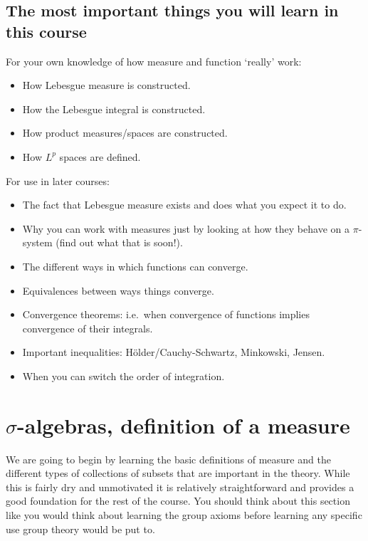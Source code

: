 \documentclass[
]{book}
\providecommand{\tightlist}{%
  \setlength{\itemsep}{0pt}\setlength{\parskip}{0pt}}
\theoremstyle{definition}
\theoremstyle{definition}
\theoremstyle{definition}
\theoremstyle{definition}
\theoremstyle{remark}
\begin{document}
\hypertarget{the-most-important-things-you-will-learn-in-this-course}{%
\section{The most important things you will learn in this course}\label{the-most-important-things-you-will-learn-in-this-course}}

For your own knowledge of how measure and function `really' work:

\begin{itemize}
\tightlist
\item
  How Lebesgue measure is constructed.
\item
  How the Lebesgue integral is constructed.
\item
  How product measures/spaces are constructed.
\item
  How \(L^p\) spaces are defined.
\end{itemize}

For use in later courses:

\begin{itemize}
\tightlist
\item
  The fact that Lebesgue measure exists and does what you expect it to do.
\item
  Why you can work with measures just by looking at how they behave on a \(\pi\)-system (find out what that is soon!).
\item
  The different ways in which functions can converge.
\item
  Equivalences between ways things converge.
\item
  Convergence theorems: i.e.~when convergence of functions implies convergence of their integrals.
\item
  Important inequalities: Hölder/Cauchy-Schwartz, Minkowski, Jensen.
\item
  When you can switch the order of integration.
\end{itemize}

\hypertarget{sigma-algebras-definition-of-a-measure}{%
\chapter{\texorpdfstring{\(\sigma\)-algebras, definition of a measure}{\textbackslash sigma-algebras, definition of a measure}}\label{sigma-algebras-definition-of-a-measure}}

We are going to begin by learning the basic definitions of measure and the different types of collections of subsets that are important in the theory. While this is fairly dry and unmotivated it is relatively straightforward and provides a good foundation for the rest of the course. You should think about this section like you would think about learning the group axioms before learning any specific use group theory would be put to.
\end{document}
